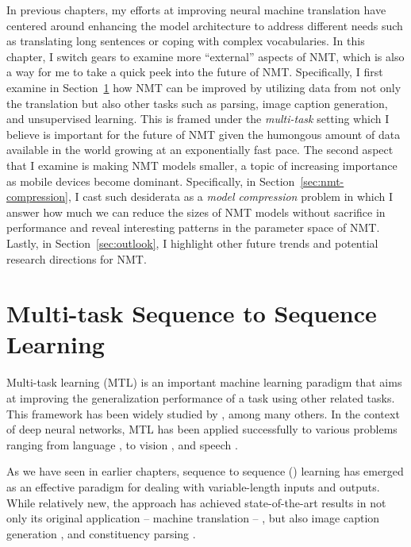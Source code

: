 In previous chapters, my efforts at improving neural machine
translation have centered around enhancing the model architecture to address
different needs such as translating long sentences or coping with
complex vocabularies. In this chapter, I switch gears to examine more ``external''
aspects of NMT, which is also a way for me to take a quick peek into the future of NMT.
Specifically, I first examine in Section~\ref{sec:multi-task} how NMT can be improved by utilizing data from
not only the translation but also other tasks such as parsing, image caption
generation, and unsupervised learning. This is framed under the {\it multi-task}
setting which I believe is important for the future of NMT given the humongous amount of
data available in the world growing at an exponentially fast pace. The second
aspect that I examine is making NMT models smaller, a topic of 
increasing importance as mobile devices become dominant. Specifically, in
Section~\ref{sec:nmt-compression}, I cast such
desiderata as a {\it model compression} problem in which I answer how much we can
reduce the sizes of NMT models without sacrifice in performance and reveal
interesting patterns in the parameter space of NMT. Lastly, in
Section~\ref{sec:outlook}, I highlight other future trends and potential
research directions for NMT.

\section{Multi-task Sequence to Sequence Learning}
\label{sec:multi-task}
Multi-task learning (MTL) is an important machine learning paradigm that
aims at improving the generalization performance of a task using other related
tasks. 
This framework has been widely studied by
, among many
others. In the context of deep neural networks, MTL has
been applied successfully to various problems ranging from language
\cite{liu15}, to vision
\cite{donahue14},
and speech \cite{heigold13,huang2013cross}.

\begin{sloppypar}
As we have seen in earlier chapters, sequence to sequence (\ssl{}) learning
\cite{kal13,sutskever14,cho14} has emerged as an effective paradigm for dealing with
variable-length inputs and outputs. 
While relatively new, the \ssl{}
approach has achieved state-of-the-art results in not only its original
application -- machine translation --
\cite{luong15,jean15,luong15attn,jean15wmt,luong15iwslt}, but also image caption generation \cite{vinyals15caption},
and constituency parsing \cite{vinyals15grammar}. 
\end{sloppypar}

